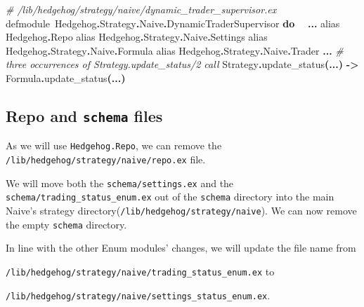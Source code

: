 \documentclass[
  oneside]{book}
\newenvironment{Shaded}{\begin{snugshade}}{\end{snugshade}}
\newcommand{\CommentTok}[1]{\textcolor[rgb]{0.56,0.35,0.01}{\textit{#1}}}
\newcommand{\ConstantTok}[1]{\textcolor[rgb]{0.56,0.35,0.01}{#1}}
\newcommand{\FunctionTok}[1]{\textcolor[rgb]{0.13,0.29,0.53}{\textbf{#1}}}
\newcommand{\ImportTok}[1]{#1}
\newcommand{\KeywordTok}[1]{\textcolor[rgb]{0.13,0.29,0.53}{\textbf{#1}}}
\newcommand{\NormalTok}[1]{#1}
\newcommand{\OperatorTok}[1]{\textcolor[rgb]{0.81,0.36,0.00}{\textbf{#1}}}
\begin{document}
\begin{Shaded}
\begin{Highlighting}[]
\CommentTok{\# /lib/hedgehog/strategy/naive/dynamic\_trader\_supervisor.ex}
\NormalTok{defmodule }\ConstantTok{Hedgehog}\OperatorTok{.}\ConstantTok{Strategy}\OperatorTok{.}\ConstantTok{Naive}\OperatorTok{.}\ConstantTok{DynamicTraderSupervisor} \KeywordTok{do}
  \OperatorTok{...}
  \ImportTok{alias} \ConstantTok{Hedgehog}\OperatorTok{.}\ConstantTok{Repo}
  \ImportTok{alias} \ConstantTok{Hedgehog}\OperatorTok{.}\ConstantTok{Strategy}\OperatorTok{.}\ConstantTok{Naive}\OperatorTok{.}\ConstantTok{Settings}
  \ImportTok{alias} \ConstantTok{Hedgehog}\OperatorTok{.}\ConstantTok{Strategy}\OperatorTok{.}\ConstantTok{Naive}\OperatorTok{.}\ConstantTok{Formula}
  \ImportTok{alias} \ConstantTok{Hedgehog}\OperatorTok{.}\ConstantTok{Strategy}\OperatorTok{.}\ConstantTok{Naive}\OperatorTok{.}\ConstantTok{Trader}
  \OperatorTok{...}
  \CommentTok{\# three occurrences of \textasciigrave{}Strategy.update\_status/2\textasciigrave{} call}
  \ConstantTok{Strategy}\OperatorTok{.}\NormalTok{update\_status}\FunctionTok{(}\OperatorTok{...}\FunctionTok{)} \OperatorTok{{-}\textgreater{}} \ConstantTok{Formula}\OperatorTok{.}\NormalTok{update\_status}\FunctionTok{(}\OperatorTok{...}\FunctionTok{)}
\end{Highlighting}
\end{Shaded}

\subsection{\texorpdfstring{Repo and \texttt{schema} files}{Repo and schema files}}\label{repo-and-schema-files}

As we will use \texttt{Hedgehog.Repo}, we can remove the \texttt{/lib/hedgehog/strategy/naive/repo.ex} file.

We will move both the \texttt{schema/settings.ex} and the \texttt{schema/trading\_status\_enum.ex} out of the \texttt{schema} directory into the main Naive's strategy directory(\texttt{/lib/hedgehog/strategy/naive}). We can now remove the empty \texttt{schema} directory.

\newpage

In line with the other Enum modules' changes, we will update the file name from

\texttt{/lib/hedgehog/strategy/naive/trading\_status\_enum.ex} to

\texttt{/lib/hedgehog/strategy/naive/settings\_status\_enum.ex}.
\end{document}

